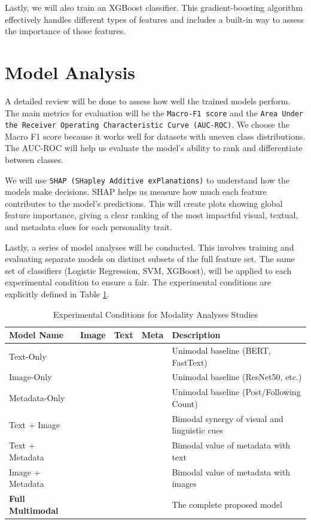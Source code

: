 Lastly, we will also train an XGBoost classifier. This gradient-boosting algorithm effectively handles different types of features and includes a built-in way to assess the importance of those features.

\section{Model Analysis}
\label{subsec:analysis}
A detailed review will be done to assess how well the trained models perform. The main metrics for evaluation will be the \texttt{Macro-F1 score} and the \texttt{Area Under the Receiver Operating Characteristic Curve (AUC-ROC)}. We choose the Macro F1 score because it works well for datasets with uneven class distributions. The AUC-ROC will help us evaluate the model's ability to rank and differentiate between classes.

We will use \texttt{SHAP (SHapley Additive exPlanations)} to understand how the models make decisions. SHAP helps us measure how much each feature contributes to the model's predictions. This will create plots showing global feature importance, giving a clear ranking of the most impactful visual, textual, and metadata clues for each personality trait.

Lastly, a series of model analyses will be conducted. This involves training and evaluating separate models on distinct subsets of the full feature set. The same set of classifiers (Logistic Regression, SVM, XGBoost), will be applied to each experimental condition to ensure a fair. The experimental conditions are explicitly defined in Table \ref{tab:ablation_conditions}.

\begin{table}[H]
	\centering
	\caption{Experimental Conditions for Modality Analyses Studies}
	\label{tab:ablation_conditions}
	\begin{tabularx}{\textwidth}{l c c c X} 
		\hline
		\textbf{Model Name} & \textbf{Image} & \textbf{Text} & \textbf{Meta} & \textbf{Description} \\ \hline
		Text-Only & & \checkmark & & Unimodal baseline (BERT, FastText) \\
		Image-Only & \checkmark & & & Unimodal baseline (ResNet50, etc.) \\
		Metadata-Only & & & \checkmark & Unimodal baseline (Post/Following Count) \\
		Text + Image & \checkmark & \checkmark & & Bimodal synergy of visual and linguistic cues \\
		Text + Metadata & & \checkmark & \checkmark & Bimodal value of metadata with text \\
		Image + Metadata & \checkmark & & \checkmark & Bimodal value of metadata with images \\
		\textbf{Full Multimodal} & \checkmark & \checkmark & \checkmark & The complete proposed model \\ \hline
	\end{tabularx}
\end{table}